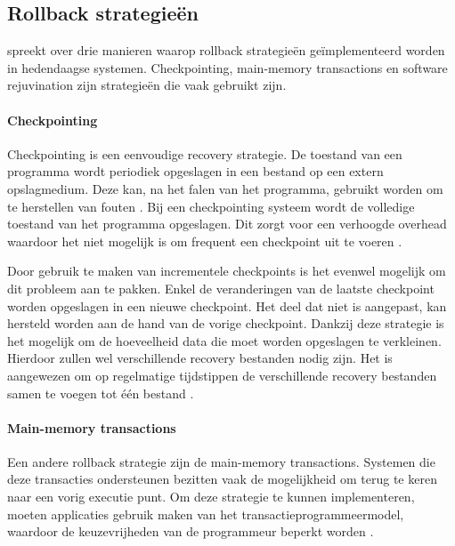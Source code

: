 \subsection{Rollback strategieën}
\citet{srinivasan2004flashback} spreekt over drie manieren waarop rollback strategieën geïmplementeerd worden in hedendaagse systemen.
Checkpointing, main-memory transactions en software rejuvination zijn strategieën die vaak gebruikt zijn.

\paragraph{Checkpointing}
Checkpointing is een eenvoudige recovery strategie.
De toestand van een programma wordt periodiek opgeslagen in een bestand op een extern opslagmedium.
Deze kan, na het falen van het programma, gebruikt worden om te herstellen van fouten \citep{plank1994libckpt}.
Bij een checkpointing systeem wordt de volledige toestand van het programma opgeslagen.
Dit zorgt voor een verhoogde overhead waardoor het niet mogelijk is om frequent een checkpoint uit te voeren \citep{srinivasan2004flashback}.

Door gebruik te maken van incrementele checkpoints is het evenwel mogelijk om dit probleem aan te pakken.
Enkel de veranderingen van de laatste checkpoint worden opgeslagen in een nieuwe checkpoint.
Het deel dat niet is aangepast, kan hersteld worden aan de hand van de vorige checkpoint.
Dankzij deze strategie is het mogelijk om de hoeveelheid data die moet worden opgeslagen te verkleinen.
Hierdoor zullen wel verschillende recovery bestanden nodig zijn.
Het is aangewezen om op regelmatige tijdstippen de verschillende recovery bestanden samen te voegen tot één bestand \citep{plank1994libckpt, elnozahy2002survey}.

\paragraph{Main-memory transactions}
Een andere rollback strategie zijn de main-memory transactions.
Systemen die deze transacties ondersteunen bezitten vaak de mogelijkheid om terug te keren naar een vorig executie punt.
Om deze strategie te kunnen implementeren, moeten applicaties gebruik maken van het transactieprogrammeermodel, waardoor de keuzevrijheden van de programmeur beperkt worden \citep{srinivasan2004flashback}.

